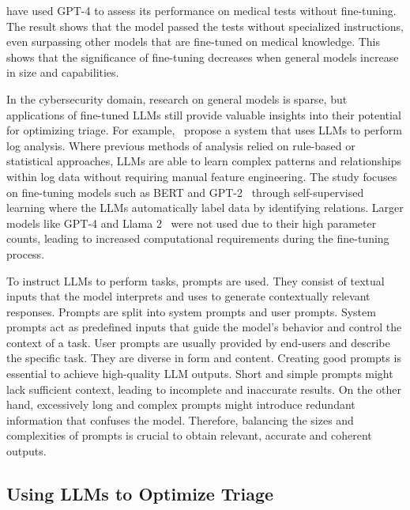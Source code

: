 \citet{nori2023capabilities} have used GPT-4 to assess its performance on medical tests without fine-tuning.
The result shows that the model passed the tests without specialized instructions, even surpassing other models that
are fine-tuned on medical knowledge.
This shows that the significance of fine-tuning decreases when general models increase in size and capabilities.

In the cybersecurity domain, research on general models is sparse, but applications of fine-tuned LLMs still provide
valuable insights into their potential for optimizing triage.
For example,\ \citet{karlsen2024large} propose a system that uses LLMs to perform log analysis.
Where previous methods of analysis relied on rule-based or statistical approaches, LLMs are able to learn complex
patterns and relationships within log data without requiring manual feature engineering.
The study focuses on fine-tuning models such as BERT and GPT-2\ \citep{radford2019language} through self-supervised
learning where the LLMs automatically label data by identifying relations.
Larger models like GPT-4 and Llama 2\ \citep{touvron2023llama} were not used due to their high parameter counts,
leading to increased computational requirements during the fine-tuning process.

To instruct LLMs to perform tasks, prompts are used.
They consist of textual inputs that the model interprets and uses to generate contextually relevant responses.
Prompts are split into system prompts and user prompts.
System prompts act as predefined inputs that guide the model's behavior and control the context of a task.
User prompts are usually provided by end-users and describe the specific task.
They are diverse in form and content.
Creating good prompts is essential to achieve high-quality LLM outputs.
Short and simple prompts might lack sufficient context, leading to incomplete and inaccurate results.
On the other hand, excessively long and complex prompts might introduce redundant information that confuses the model.
Therefore, balancing the sizes and complexities of prompts is crucial to obtain relevant, accurate and coherent outputs.

\subsection{Using LLMs to Optimize Triage}
\label{subsec:rq1-llms-in-context}

